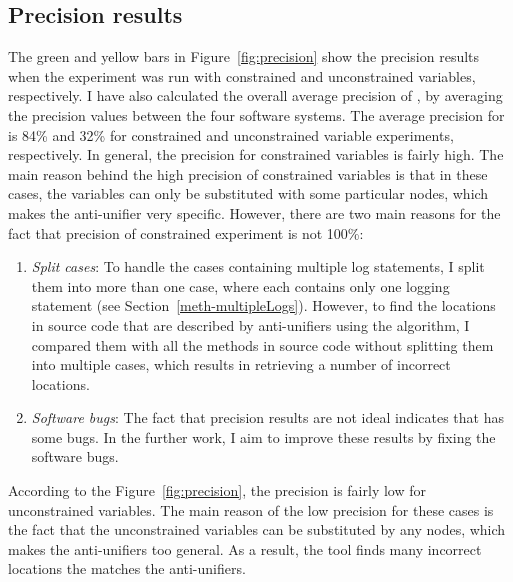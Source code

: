 \subsection{{Precision results}}  \label{precision-results}
The green and yellow bars in Figure~\ref{fig:precision} show the precision results when the experiment was run with constrained and unconstrained variables, respectively. I have also calculated the overall average precision of , by averaging the precision values between the four software systems. The average precision for  is 84\% and 32\% for constrained and unconstrained variable experiments, respectively. In general, the precision for constrained variables is fairly high. The main reason behind the high precision of constrained variables is that in these cases, the variables can only be substituted with some particular nodes, which makes the anti-unifier very specific. However, there are two main reasons for the fact that precision of constrained experiment is not 100\%:
\begin{enumerate} [leftmargin=.5in]

\item \emph{Split cases}: To handle the cases containing multiple log statements, I split them into more than one case, where each contains only one logging statement (see Section~\ref{meth-multipleLogs}). However, to find the locations in source code that are described by anti-unifiers using the  algorithm, I compared them with all the methods in source code without splitting them into multiple cases, which results in retrieving a number of incorrect locations.

\item \emph{Software bugs}: The fact that precision results are not ideal indicates that  has some bugs. In the further work, I aim to improve these results by fixing the software bugs.
\end{enumerate}

According to the Figure~\ref{fig:precision}, the precision is fairly low for unconstrained variables. The main reason of the low precision for these cases is the fact that the unconstrained variables can be substituted by any nodes, which makes the anti-unifiers too general. As a result, the tool finds many incorrect locations the matches the anti-unifiers.






